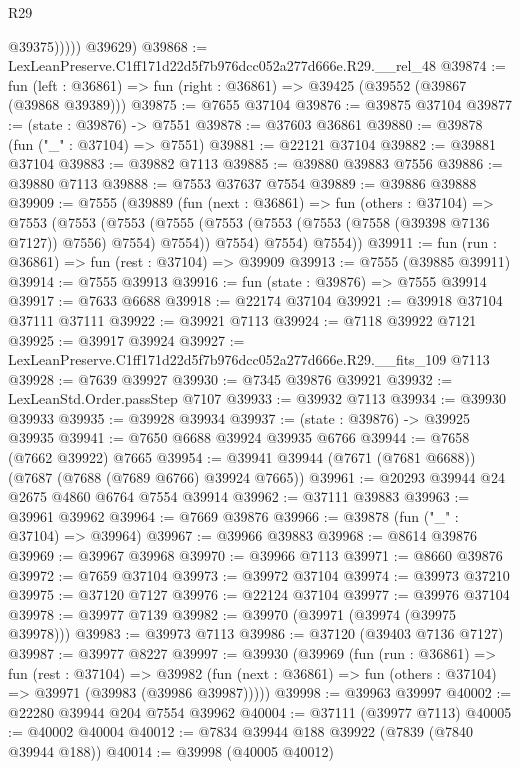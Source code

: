 \begin{lexlean}{R29}
\begin{coremodule}
                @39375)))))
      @39629)
@39868 := LexLeanPreserve.C1ff171d22d5f7b976dcc052a277d666e.R29.__rel_48
@39874 := fun (left : @36861) => fun (right : @36861) => @39425 (@39552 (@39867 (@39868 @39389)))
@39875 := @7655 @37104
@39876 := @39875 @37104
@39877 := (state : @39876) -> @7551
@39878 := @37603 @36861
@39880 := @39878 (fun ("_" : @37104) => @7551)
@39881 := @22121 @37104
@39882 := @39881 @37104
@39883 := @39882 @7113
@39885 := @39880 @39883 @7556
@39886 := @39880 @7113
@39888 := @7553 @37637 @7554
@39889 := @39886 @39888
@39909 := @7555
    (@39889
      (fun (next : @36861) =>
      fun (others : @37104) =>
      @7553
        (@7553
          (@7553
            (@7555 (@7553 (@7553 (@7553 (@7558 (@39398 @7136 @7127)) @7556) @7554) @7554))
            @7554)
          @7554)
        @7554))
@39911 := fun (run : @36861) => fun (rest : @37104) => @39909
@39913 := @7555 (@39885 @39911)
@39914 := @7555 @39913
@39916 := fun (state : @39876) => @7555 @39914
@39917 := @7633 @6688
@39918 := @22174 @37104
@39921 := @39918 @37104 @37111 @37111
@39922 := @39921 @7113
@39924 := @7118 @39922 @7121
@39925 := @39917 @39924
@39927 := LexLeanPreserve.C1ff171d22d5f7b976dcc052a277d666e.R29.__fits_109 @7113
@39928 := @7639 @39927
@39930 := @7345 @39876 @39921
@39932 := LexLeanStd.Order.passStep @7107
@39933 := @39932 @7113
@39934 := @39930 @39933
@39935 := @39928 @39934
@39937 := (state : @39876) -> @39925 @39935
@39941 := @7650 @6688 @39924 @39935 @6766
@39944 := @7658 (@7662 @39922) @7665
@39954 := @39941 @39944 (@7671 (@7681 @6688)) (@7687 (@7688 (@7689 @6766) @39924 @7665))
@39961 := @20293 @39944 @24 @2675 @4860 @6764 @7554 @39914
@39962 := @37111 @39883
@39963 := @39961 @39962
@39964 := @7669 @39876
@39966 := @39878 (fun ("_" : @37104) => @39964)
@39967 := @39966 @39883
@39968 := @8614 @39876
@39969 := @39967 @39968
@39970 := @39966 @7113
@39971 := @8660 @39876
@39972 := @7659 @37104
@39973 := @39972 @37104
@39974 := @39973 @37210
@39975 := @37120 @7127
@39976 := @22124 @37104
@39977 := @39976 @37104
@39978 := @39977 @7139
@39982 := @39970 (@39971 (@39974 (@39975 @39978)))
@39983 := @39973 @7113
@39986 := @37120 (@39403 @7136 @7127)
@39987 := @39977 @8227
@39997 := @39930
    (@39969
      (fun (run : @36861) =>
      fun (rest : @37104) =>
      @39982 (fun (next : @36861) => fun (others : @37104) => @39971 (@39983 (@39986 @39987)))))
@39998 := @39963 @39997
@40002 := @22280 @39944 @204 @7554 @39962
@40004 := @37111 (@39977 @7113)
@40005 := @40002 @40004
@40012 := @7834 @39944 @188 @39922 (@7839 (@7840 @39944 @188))
@40014 := @39998 (@40005 @40012)

\end{coremodule}
\end{lexlean}
